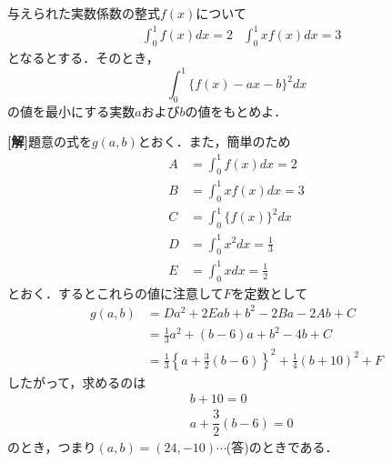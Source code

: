 \documentclass[a4j]{jarticle}
\title{}
\begin{document}

\begin{oframed}
与えられた実数係数の整式$f(x)$について
     \begin{align*}
    & \int_0^1f(x)dx=2 &\int_0^1xf(x)dx=3
     \end{align*}
となるとする．そのとき，
\[\int_0^1\{f(x)-ax-b\}^2dx \]
の値を最小にする実数$a$および$b$の値をもとめよ．
\end{oframed}

\setlength{\columnseprule}{0.4pt}
\begin{multicols}{2}
{\bf[解]}題意の式を$g(a,b)$とおく．また，簡単のため
     \begin{align*}
     A&= \int_0^1f(x)dx=2 \\
     B&=\int_0^1xf(x)dx=3 \\
     C&=\int_0^1\{f(x)\}^2dx \\
     D&=\int_0^1x^2dx=\frac{1}{3} \\
     E&=\int_0^1xdx =\frac{1}{2}
     \end{align*}
とおく．するとこれらの値に注意して$F$を定数として
     \begin{align*}
     g(a,b)&=Da^2+2Eab+b^2-2Ba-2Ab+C \\
     &=\frac{1}{3}a^2+(b-6)a+b^2-4b+C \\
     &=\frac{1}{3}\left\{a+\frac{3}{2}\left(b-6\right)\right\}^2+\frac{1}{4}(b+10)^2+F
     \end{align*}
したがって，求めるのは
     \begin{align*}
     &b+10=0 \\
     &a+\dfrac{3}{2}\left(b-6\right)=0
     \end{align*}
のとき，つまり$(a,b)=(24,-10)\cdots$(答)のときである．
\newpage
\end{multicols}
\end{document}
